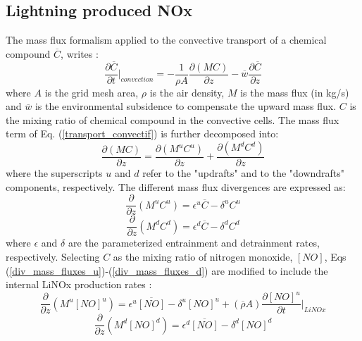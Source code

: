 \subsection{Lightning produced NOx}
The mass flux formalism applied to the convective transport of a chemical 
compound $\overline{C}$, writes :
%
\begin{equation}\label{transport_convectif}
{\frac {\partial \overline C}{\partial t}}\bigg\vert_{convection} =
-\frac{1}{\rho A} \frac {\partial (MC)}{\partial z} 
- \overline{w} {\frac {\partial \overline C}{\partial z}}
\end{equation}
%
where $A$ is the grid mesh area, $\rho$ is the air density, $M$ is the mass flux
(in kg/s) and $\overline{w}$ is the environmental subsidence to compensate the
upward mass flux. $C$ is the mixing ratio of chemical compound in the 
convective cells. The mass flux term of Eq. (\ref{transport_convectif}) is
further decomposed into:
%
\begin{equation}\label{decomposition}
\frac {\partial (MC)}{\partial z} = \frac {\partial (M^u C^u)}{\partial z} + \frac {\partial (M^d C^d)}{\partial z}
\end{equation}
%
where the superscripts $u$ and $d$ refer to the "updrafts" and to the 
"downdrafts" components, respectively. The different mass flux divergences are 
expressed 
as:
%
\begin{equation}\label{div_mass_fluxes_u}
\frac{\partial}{\partial z} (M^u C^u) = \epsilon^u\overline{C}-\delta^u C^u
\end{equation}
\begin{equation}\label{div_mass_fluxes_d}
\frac{\partial}{\partial z} (M^d C^d) = \epsilon^d\overline{C}-\delta^d C^d
\end{equation}
%
where $\epsilon$ and $\delta$ are the parameterized entrainment and detrainment
rates, respectively. Selecting $C$ as the mixing ratio of nitrogen monoxide, 
$[NO]$, Eqs (\ref{div_mass_fluxes_u})-(\ref{div_mass_fluxes_d}) are modified to
include the internal LiNOx production rates \citep{Mari2006}:
%
\begin{equation}\label{div_flux_NO_u}
\frac{\partial}{\partial z} (M^u[NO]^u) = \epsilon^u\overline{[NO]}-\delta^u[NO]^u + (\overline{\rho} A) \frac{\partial [NO]^u}{\partial t}\bigg\vert_{LiNOx}
\end{equation}
\begin{equation}\label{div_flux_NO_d}
\frac{\partial}{\partial z} (M^d[NO]^d) = \epsilon^d\overline{[NO]}-\delta^d[NO]^d
\end{equation}
